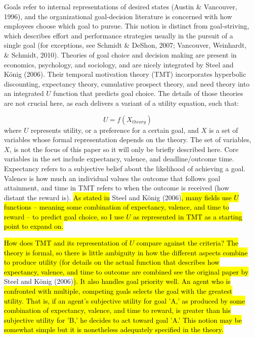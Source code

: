 \documentclass[english,,man]{apa6}
\theoremstyle{definition}
\theoremstyle{definition}
\theoremstyle{definition}
\theoremstyle{remark}
\begin{document}
Goals refer to internal representations of desired states (Austin \&
Vancouver, 1996), and the organizational goal-decision literature is
concerned with how employees choose which goal to pursue. This notion is
distinct from goal-striving, which describes effort and performance
strategies usually in the pursuit of a single goal (for exceptions, see
Schmidt \& DeShon, 2007; Vancouver, Weinhardt, \& Schmidt, 2010).
Theories of goal choice and decision making are present in economics,
psychology, and sociology, and are nicely integrated by Steel and König
(2006). Their temporal motivation theory (TMT) incorporates hyperbolic
discounting, expectancy theory, cumulative prospect theory, and need
theory into an integrated \(U\) function that predicts goal choice. The
details of those theories are not crucial here, as each delivers a
variant of a utility equation, such that:

\begin{equation}
U = f(X_{theory})
\end{equation} \noindent where \(U\) represents utility, or a preference
for a certain goal, and \(X\) is a set of variables whose formal
representation depends on the theory. The set of variables, \(X\), is
not the focus of this paper so it will only be briefly described here.
Core variables in the set include expectancy, valence, and
deadline/outcome time. Expectancy refers to a subjective belief about
the likelihood of achieving a goal. Valence is how much an individual
values the outcome that follows goal attainment, and time in TMT refers
to when the outcome is received (how distant the reward is).
\hl{As stated in} Steel and König
(2006)\hl{, many fields use $U$ functions -- meaning some combination of expectancy, valence, and time to reward -- to predict goal choice, so I use $U$ as represented in TMT as a starting point to expand on.}

\hl{How does TMT and its representation of $U$ compare against the criteria? The theory is formal, so there is little ambiguity in how the different aspects combine to produce utility (for details on the actual function that describes how expectancy, valence, and time to outcome are combined see the original paper by }Steel
and König
(2006)\hl{). It also handles goal priority well. An agent who is confronted with multiple, competing goals selects the goal with the greatest utility. That is, if an agent's subjective utility for goal 'A,' as produced by some combination of expectancy, valence, and time to reward, is greater than his subjective utility for 'B,' he decides to act toward goal 'A.' This notion may be somewhat simple but it is nonetheless adequately specified in the theory.}
\end{document}
